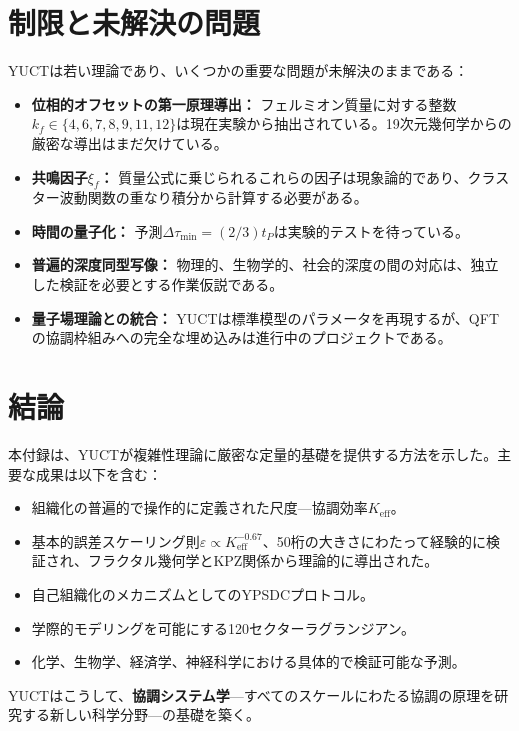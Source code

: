 \documentclass[11pt,a4paper]{article}
\theoremstyle{remark}
\newcommand{\Keff}{K_{\mathrm{eff}}}
\begin{document}
	\section{制限と未解決の問題}
	\label{sec:limitations}
	
	YUCTは若い理論であり、いくつかの重要な問題が未解決のままである：
	\begin{itemize}
		\item \textbf{位相的オフセットの第一原理導出：} フェルミオン質量に対する整数\(k_f \in \{4,6,7,8,9,11,12\}\)は現在実験から抽出されている。19次元幾何学からの厳密な導出はまだ欠けている。
		\item \textbf{共鳴因子\(\xi_f\)：} 質量公式に乗じられるこれらの因子は現象論的であり、クラスター波動関数の重なり積分から計算する必要がある。
		\item \textbf{時間の量子化：} 予測\(\Delta\tau_{\min} = (2/3) t_P\)は実験的テストを待っている。
		\item \textbf{普遍的深度同型写像：} 物理的、生物学的、社会的深度の間の対応は、独立した検証を必要とする作業仮説である。
		\item \textbf{量子場理論との統合：} YUCTは標準模型のパラメータを再現するが、QFTの協調枠組みへの完全な埋め込みは進行中のプロジェクトである。
	\end{itemize}
	
	\section{結論}
	\label{sec:conclusion}
	
	本付録は、YUCTが複雑性理論に厳密な定量的基礎を提供する方法を示した。主要な成果は以下を含む：
	\begin{itemize}
		\item 組織化の普遍的で操作的に定義された尺度—協調効率\(\Keff\)。
		\item 基本的誤差スケーリング則\(\varepsilon \propto \Keff^{-0.67}\)、50桁の大きさにわたって経験的に検証され、フラクタル幾何学とKPZ関係から理論的に導出された。
		\item 自己組織化のメカニズムとしてのYPSDCプロトコル。
		\item 学際的モデリングを可能にする120セクターラグランジアン。
		\item 化学、生物学、経済学、神経科学における具体的で検証可能な予測。
	\end{itemize}
	
	YUCTはこうして、\textbf{協調システム学}—すべてのスケールにわたる協調の原理を研究する新しい科学分野—の基礎を築く。
	
\end{document}
